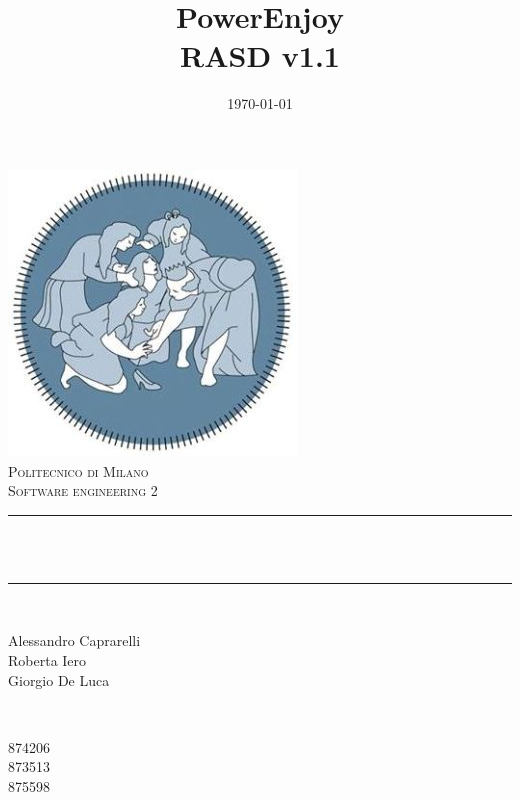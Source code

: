 \documentclass[12pt]{report}
\title{PowerEnjoy\\RASD v1.1}                             %
\date{\today}                                           %
\makeatletter
\let\thetitle\@title
\let\thedate\@date
\makeatother
\begin{document}

\begin{titlepage}
    \centering
    \vspace*{0.5 cm}
    \includegraphics[scale = 0.75]{images/poli.jpg}\\[1.0 cm]   %
    \textsc{\LARGE Politecnico di Milano}\\[2.0 cm]   %
    \textsc{\large Software engineering 2}\\[0.5 cm]               %
    \rule{\linewidth}{0.2 mm} \\[0.4 cm]
    { \huge \bfseries \thetitle}\\
    \rule{\linewidth}{0.2 mm} \\[1.5 cm]
    
    \begin{minipage}{0.4\textwidth}
        \begin{flushleft} \large
            Alessandro Caprarelli \\
	 Roberta Iero \\
	 Giorgio De Luca
	
            \end{flushleft}
            \end{minipage}~ 
            \begin{minipage}{0.4\textwidth}
            \begin{flushright} \large
            874206  \\
            873513 \\
            875598
        \end{flushright}
    \end{minipage}\\[2 cm]
    
    {\large \thedate}\\[2 cm]
 
    \vfill
    
\end{titlepage}
\end{document}
